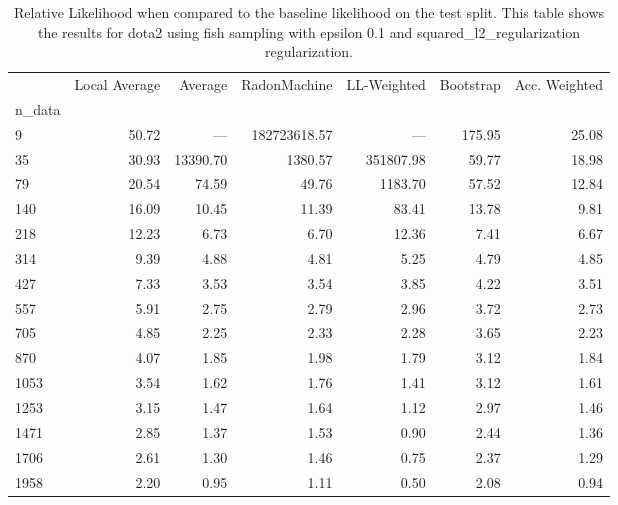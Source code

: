 \begin{table}
\centering
\caption{Relative Likelihood when compared to the baseline likelihood on the test split. This table shows the results for  dota2 using  fish sampling with epsilon  0.1 and  squared_l2_regularization regularization.}
\label{tab:10}
\begin{tabular}{lrrrrrr}
\toprule
{} &  Local Average &  Average &  RadonMachine &  LL-Weighted &  Bootstrap &  Acc. Weighted \\
n\_data &                &          &               &              &            &                \\
\midrule
9      &          50.72 &      --- &  182723618.57 &          --- &     175.95 &          25.08 \\
35     &          30.93 & 13390.70 &       1380.57 &    351807.98 &      59.77 &          18.98 \\
79     &          20.54 &    74.59 &         49.76 &      1183.70 &      57.52 &          12.84 \\
140    &          16.09 &    10.45 &         11.39 &        83.41 &      13.78 &           9.81 \\
218    &          12.23 &     6.73 &          6.70 &        12.36 &       7.41 &           6.67 \\
314    &           9.39 &     4.88 &          4.81 &         5.25 &       4.79 &           4.85 \\
427    &           7.33 &     3.53 &          3.54 &         3.85 &       4.22 &           3.51 \\
557    &           5.91 &     2.75 &          2.79 &         2.96 &       3.72 &           2.73 \\
705    &           4.85 &     2.25 &          2.33 &         2.28 &       3.65 &           2.23 \\
870    &           4.07 &     1.85 &          1.98 &         1.79 &       3.12 &           1.84 \\
1053   &           3.54 &     1.62 &          1.76 &         1.41 &       3.12 &           1.61 \\
1253   &           3.15 &     1.47 &          1.64 &         1.12 &       2.97 &           1.46 \\
1471   &           2.85 &     1.37 &          1.53 &         0.90 &       2.44 &           1.36 \\
1706   &           2.61 &     1.30 &          1.46 &         0.75 &       2.37 &           1.29 \\
1958   &           2.20 &     0.95 &          1.11 &         0.50 &       2.08 &           0.94 \\
\bottomrule
\end{tabular}
\end{table}
